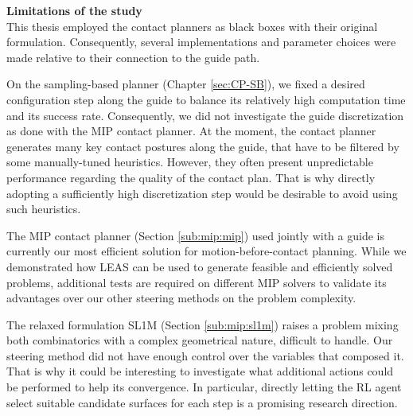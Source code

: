 
\hfill \break
\hfill \break

\noindent\textbf{Limitations of the study}\\

This thesis employed the contact planners as black boxes with their original formulation. Consequently, several implementations and parameter choices were made relative to their connection to the guide path.

On the sampling-based planner (Chapter \ref{sec:CP-SB}), we fixed a desired configuration step along the guide to balance its relatively high computation time and its success rate. 
Consequently, we did not investigate the guide discretization as done with the MIP contact planner.
At the moment, the contact planner generates many key contact postures along the guide, that have to be filtered by some manually-tuned heuristics. 
However, they often present unpredictable performance regarding the quality of the contact plan.
That is why directly adopting a sufficiently high discretization step would be desirable to avoid using such heuristics.

The MIP contact planner (Section \ref{sub:mip:mip}) used jointly with a guide is currently our most efficient solution for motion-before-contact planning.
While we demonstrated how LEAS can be used to generate feasible and efficiently solved problems, additional tests are required on different MIP solvers to validate
its advantages over our other steering methods on the problem complexity.

The relaxed formulation SL1M (Section \ref{sub:mip:sl1m}) raises a problem mixing both combinatorics with a complex geometrical nature, difficult to handle.
Our steering method did not have enough control over the variables that composed it. That is why it could be interesting to investigate what additional actions could be performed to help its convergence. In particular, directly letting the RL agent select suitable candidate surfaces for each step is a promising research direction.


